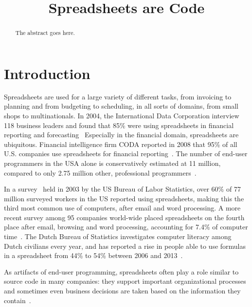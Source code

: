 \documentclass[conference]{IEEEtran}
\begin{document}
\title{Spreadsheets are Code}

\author{
}


\maketitle

\begin{abstract}
The abstract goes here.
\end{abstract}

\IEEEpeerreviewmaketitle

\section{Introduction}
Spreadsheets are used for a large variety of different tasks, from invoicing to planning and from budgeting to scheduling, in all sorts of domains, from small shops to multinationals. In 2004, the International Data Corporation interview 118 business leaders and found that 85\% were using spreadsheets in financial reporting and forecasting~\cite{Panko2008} Especially in the financial domain, spreadsheets are ubiquitous. Financial intelligence firm CODA reported in 2008 that 95\% of all U.S. companies use spreadsheets for financial reporting~\cite{Panko2008}. The number of end-user programmers in the USA alone is conservatively estimated at 11 million, compared to only 2.75 million other, professional programmers~\cite{Scaf2005}. 

In a survey~\cite{BLS2003} held in 2003 by the US Bureau of Labor Statistics, over 60\% of 77 million surveyed workers in the US reported using spreadsheets, making this the third most common use of computers, after email and word processing. A more recent survey among 95 companies world-wide placed spreadsheets on the fourth place after email, browsing and word processing, accounting for 7.4\% of computer time~\cite{Wellnomics2007}. The Dutch Bureau of Statistics investigates computer literacy among Dutch civilians every year, and has reported a rise in people able to use formulas in a spreadsheet from 44\% to 54\% between 2006 and 2013~\cite{CBS2013}.




As artifacts of end-user programming, spreadsheets often play a role similar to source code in many companies: they support important organizational processes and sometimes even business decisions are taken based on the information they contain~\cite{Hermans2011}.
\end{document}
